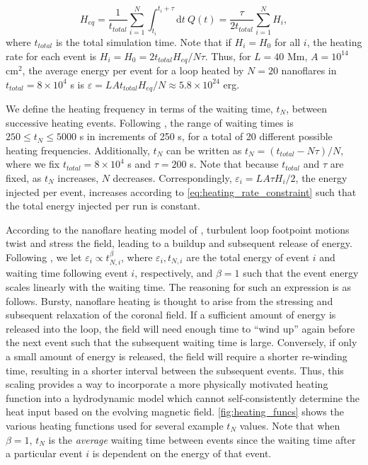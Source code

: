 \documentclass[preprint,linenumbers]{aastex}
\begin{document}
	\begin{equation}
		\label{eq:heating_rate_constraint}
		H_{eq} = \frac{1}{t_{total}}\sum_{i=1}^N\int_{t_i}^{t_i+\tau}\mathrm{d}t~Q(t) = \frac{\tau}{2t_{total}}\sum_{i=1}^NH_i,
	\end{equation}
	where $t_{total}$ is the total simulation time. Note that if $H_i=H_0$ for all $i$, the heating rate for each event is $H_i=H_0=2t_{total}H_{eq}/N\tau$. Thus, for $L=40$ Mm, $A=10^{14}$ cm$^2$, the average energy per event for a loop heated by $N=20$ nanoflares in $t_{total}=8\times10^4$ s is $\varepsilon=LAt_{total}H_{eq}/N\approx5.8\times10^{24}$ erg.
	\par We define the heating frequency in terms of the waiting time, $t_N$, between successive heating events. Following \citet{cargill_active_2014}, the range of waiting times is $250\le t_N\le5000$ s in increments of 250 s, for a total of 20 different possible heating frequencies. Additionally, $t_N$ can be written as $t_N=(t_{total}-N\tau)/N$, where we fix $t_{total}=8\times10^4$ s and $\tau=200$ s. Note that because $t_{total}$ and $\tau$ are fixed, as $t_N$ increases, $N$ decreases. Correspondingly, $\varepsilon_i=LA\tau H_i/2$, the energy injected per event, increases according to \autoref{eq:heating_rate_constraint} such that the total energy injected per run is constant.
	\par According to the nanoflare heating model of \citet{parker_nanoflares_1988}, turbulent loop footpoint motions twist and stress the field, leading to a buildup and subsequent release of energy. Following \citet{cargill_active_2014}, we let $\varepsilon_i\propto t_{N,i}^{\beta}$, where $\varepsilon_i,t_{N,i}$ are the total energy of event $i$ and waiting time following event $i$, respectively, and $\beta=1$ such that the event energy scales linearly with the waiting time. The reasoning for such an expression is as follows. Bursty, nanoflare heating is thought to arise from the stressing and subsequent relaxation of the coronal field. If a sufficient amount of energy is released into the loop, the field will need enough time to ``wind up'' again before the next event such that the subsequent waiting time is large. Conversely, if only a small amount of energy is released, the field will require a shorter re-winding time, resulting in a shorter interval between the subsequent events. Thus, this scaling provides a way to incorporate a more physically motivated heating function into a hydrodynamic model which cannot self-consistently determine the heat input based on the evolving magnetic field. \autoref{fig:heating_funcs} shows the various heating functions used for several example $t_N$ values. Note that when $\beta=1$, $t_N$ is the \textit{average} waiting time between events since the waiting time after a particular event $i$ is dependent on the energy of that event.
\end{document}
